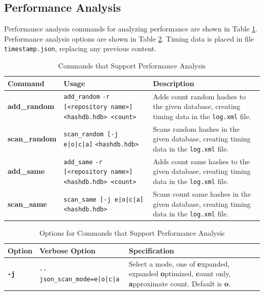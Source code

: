\documentclass[11pt,fleqn]{article} %
\begin{document}
\subsection{Performance Analysis}
\label{PerformanceAnalysis}
Performance analysis commands for analyzing \hdb performance are shown in Table \ref{tab:analysis}. Performance analysis options are shown in Table \ref{tab:AnalysisOptions}. Timing data is placed in file \verb+timestamp.json+, replacing any previous content.

\begin{table}[!ht]
\centering
\caption{Commands that Support \hdb Performance Analysis}
\label{tab:analysis}
\begin{tabular}{|p{3.5 cm}|p{6 cm}|p{4 cm}|}
\hline \hline
\textbf{Command} & \textbf{Usage} & \textbf{Description} \\
\hline
\textbf{add\_random} & \verb+add_random+ \verb+-r [<repository name>]+ \verb+<hashdb.hdb> <count>+ & Adds count random hashes to the given database, creating timing data in the \texttt{log.xml} file.\\
\hline
\textbf{scan\_random} & \verb+scan_random [-j e|o|c|a]+ \verb+<hashdb.hdb>+ & Scans random hashes in the given database, creating timing data in the \texttt{log.xml} file.\\
\hline
\textbf{add\_same} & \verb+add_same+ \verb+-r [<repository name>]+ \verb+<hashdb.hdb> <count>+ & Adds count same hashes to the given database, creating timing data in the \texttt{log.xml} file.\\
\hline
\textbf{scan\_same} & \verb+scan_same [-j e|o|c|a]+ \verb+<hashdb.hdb>+ & Scans count same hashes in the given database, creating timing data in the \texttt{log.xml} file.\\
\hline
\end{tabular}
\end{table}

\begin{table}[!ht]
\centering
\caption{Options for Commands that Support Performance Analysis}
\label{tab:AnalysisOptions}
\begin{tabular}{|p{1.5 cm}|p{8 cm}|p{4 cm}|}
\hline \hline
\textbf{Option} & \textbf{Verbose Option} & \textbf{Specification} \\
\hline
\textbf{\texttt{-j}} & \verb+--json_scan_mode=e|o|c|a+ & Select a mode, one of \textbf{e}xpanded, expanded \textbf{o}ptimized, \textbf{c}ount only, \textbf{a}pproximate count. Default is \textbf{o}.\\
\hline
\end{tabular}
\end{table}
\end{document}
